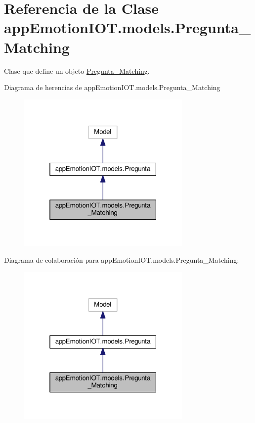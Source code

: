 \hypertarget{classappEmotionIOT_1_1models_1_1Pregunta__Matching}{}\section{Referencia de la Clase app\+Emotion\+I\+O\+T.\+models.\+Pregunta\+\_\+\+Matching}
\label{classappEmotionIOT_1_1models_1_1Pregunta__Matching}


Clase que define un objeto \hyperlink{classappEmotionIOT_1_1models_1_1Pregunta__Matching}{Pregunta\+\_\+\+Matching}.  




Diagrama de herencias de app\+Emotion\+I\+O\+T.\+models.\+Pregunta\+\_\+\+Matching
\nopagebreak
\begin{figure}[H]
\begin{center}
\leavevmode
\includegraphics[width=241pt]{classappEmotionIOT_1_1models_1_1Pregunta__Matching__inherit__graph}
\end{center}
\end{figure}


Diagrama de colaboración para app\+Emotion\+I\+O\+T.\+models.\+Pregunta\+\_\+\+Matching\+:
\nopagebreak
\begin{figure}[H]
\begin{center}
\leavevmode
\includegraphics[width=241pt]{classappEmotionIOT_1_1models_1_1Pregunta__Matching__coll__graph}
\end{center}
\end{figure}
